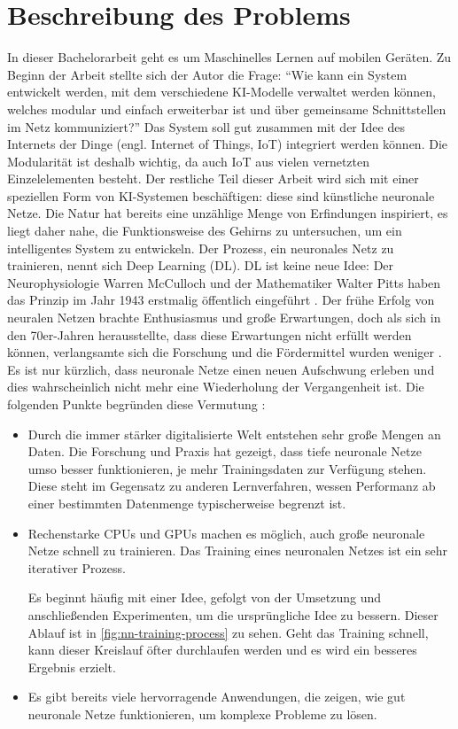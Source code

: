\section{Beschreibung des Problems}
In dieser Bachelorarbeit geht es um Maschinelles Lernen auf mobilen Geräten.
Zu Beginn der Arbeit stellte sich der Autor die Frage:
\enquote{Wie kann ein System entwickelt werden, mit dem verschiedene KI-Modelle
  verwaltet werden können, welches modular und einfach erweiterbar ist
  und über gemeinsame Schnittstellen im Netz kommuniziert?}
Das System soll gut zusammen mit der Idee des Internets der Dinge
(engl. Internet of Things, IoT) integriert werden können.
Die Modularität ist deshalb wichtig, da auch IoT aus vielen vernetzten
Einzelelementen besteht.
Der restliche Teil dieser Arbeit wird sich mit einer
speziellen Form von KI-Systemen beschäftigen: diese sind künstliche
neuronale Netze. Die Natur hat bereits eine unzählige Menge von Erfindungen
inspiriert, es liegt daher nahe, die Funktionsweise des Gehirns zu
untersuchen, um ein intelligentes System zu entwickeln.
Der Prozess, ein neuronales Netz zu trainieren, nennt sich Deep Learning (DL).
DL ist keine neue Idee:
Der Neurophysiologie Warren McCulloch und der Mathematiker Walter Pitts
haben das Prinzip im Jahr 1943 erstmalig öffentlich eingeführt
\parencite[280]{book:hands-on-ml}. Der frühe Erfolg von neuralen
Netzen brachte Enthusiasmus und große Erwartungen,
doch als sich in den 70er-Jahren herausstellte, dass diese Erwartungen nicht erfüllt
werden können, verlangsamte sich die Forschung und die Fördermittel
wurden weniger \parencite[280]{book:hands-on-ml}.
Es ist nur kürzlich, dass neuronale Netze einen neuen Aufschwung erleben
und dies wahrscheinlich nicht mehr eine Wiederholung der Vergangenheit ist.
Die folgenden Punkte begründen diese Vermutung \parencite[280]{book:hands-on-ml}:
\begin{itemize}
  \item Durch die immer stärker digitalisierte Welt
        entstehen sehr große Mengen an Daten.
        Die Forschung und Praxis hat gezeigt, dass tiefe neuronale Netze umso besser funktionieren,
        je mehr Trainingsdaten zur Verfügung stehen. Diese steht im Gegensatz
        zu anderen Lernverfahren, wessen Performanz ab einer bestimmten
        Datenmenge typischerweise begrenzt ist.
  \item Rechenstarke CPUs und GPUs machen es möglich, auch große neuronale Netze
        schnell zu trainieren. Das Training eines neuronalen
        Netzes ist ein sehr iterativer Prozess.
        
        Es beginnt häufig mit einer Idee,
        gefolgt von der Umsetzung und anschließenden Experimenten, um die ursprüngliche
        Idee zu bessern.
        Dieser Ablauf ist in \autoref{fig:nn-training-process} zu sehen.
        Geht das Training schnell, kann dieser Kreislauf öfter durchlaufen
        werden und es wird ein besseres Ergebnis erzielt.
  \item Es gibt bereits viele hervorragende Anwendungen, die zeigen,
        wie gut neuronale Netze funktionieren, um komplexe Probleme zu lösen.
\end{itemize}
